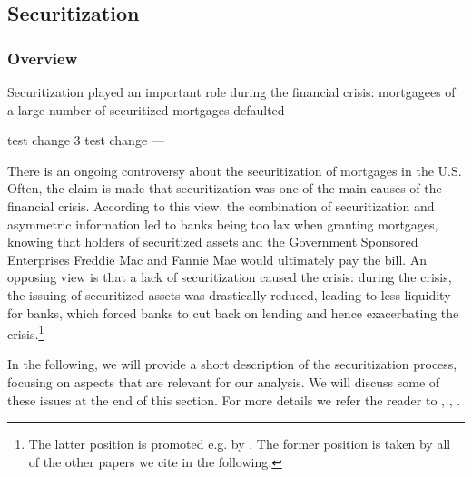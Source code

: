 \documentclass[11pt,twopage]{article}
\begin{document}
\subsection{Securitization}
\label{sec:securitization}

\subsubsection{Overview}

Securitization played an important role during the financial crisis: mortgagees of a large number of securitized mortgages defaulted

test change 3
test change
---

There is an ongoing controversy about the securitization of mortgages
in the U.S. Often, the claim is made that
securitization was one of the main causes of the financial
crisis. According to this view, the combination of securitization 
and asymmetric information led to banks being too
lax when granting mortgages, knowing that holders of securitized
assets and the Government Sponsored Enterprises Freddie Mac and Fannie
Mae would ultimately pay the bill. An opposing view is that a lack of
securitization caused the crisis: during the crisis, the issuing of
securitized assets was drastically reduced, leading to less liquidity
for banks, which forced banks to cut back on lending and hence
exacerbating the crisis.\footnote{The latter position is promoted e.g. by \cite{albertazzi2011securitization}. The former position is taken by all of the other papers we cite in the following.}

In the following, we will provide a short description of the
securitization process, focusing on aspects that are relevant for our analysis. We will discuss some of these issues
at the end of this section. For more details we refer the reader
to \cite{keys2008did}, \cite{tirole2011illiquidity},
\cite{brunnermeier2009deciphering}.

%
%
\end{document}
